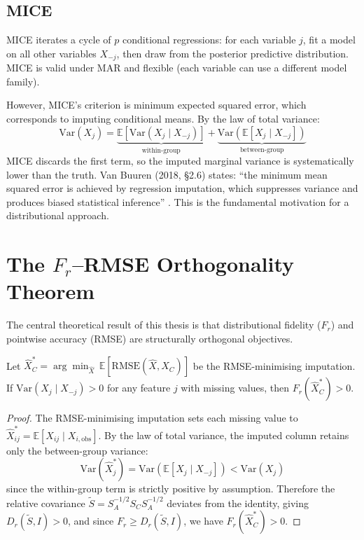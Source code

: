 \subsection{MICE}

MICE \cite{vanBuuren2011} iterates a cycle of $p$ conditional regressions: for each variable $j$, fit a model on all other variables $X_{-j}$, then draw from the posterior predictive distribution. MICE is valid under MAR and flexible (each variable can use a different model family).

However, MICE's criterion is minimum expected squared error, which corresponds to imputing conditional means. By the law of total variance:
\begin{equation}
    \text{Var}(X_j) = \underbrace{\mathbb{E}[\text{Var}(X_j \mid X_{-j})]}_{\text{within-group}} + \underbrace{\text{Var}(\mathbb{E}[X_j \mid X_{-j}])}_{\text{between-group}}
\end{equation}
MICE discards the first term, so the imputed marginal variance is systematically lower than the truth. Van Buuren (2018, \S2.6) states: ``the minimum mean squared error is achieved by regression imputation, which suppresses variance and produces biased statistical inference'' \cite{vanBuuren2018}. This is the fundamental motivation for a distributional approach.

\section{The \texorpdfstring{$F_r$}{Fr}--RMSE Orthogonality Theorem}
\label{sec:orthogonality}

The central theoretical result of this thesis is that distributional fidelity ($F_r$) and pointwise accuracy (RMSE) are structurally orthogonal objectives.

\begin{proposition}
\label{prop:rmse_implies_fr}
Let $\hat{X}_C^{*} = \arg\min_{\hat{X}}\,\mathbb{E}[\mathrm{RMSE}(\hat{X}, X_C)]$ be the RMSE-minimising imputation. If $\mathrm{Var}(X_j \mid X_{-j}) > 0$ for any feature $j$ with missing values, then $F_r(\hat{X}_C^{*}) > 0$.
\end{proposition}

\begin{proof}
The RMSE-minimising imputation sets each missing value to $\hat{X}_{ij}^{*} = \mathbb{E}[X_{ij} \mid X_{i,\text{obs}}]$. By the law of total variance, the imputed column retains only the between-group variance:
\[
  \mathrm{Var}(\hat{X}_j^{*}) = \mathrm{Var}(\mathbb{E}[X_j \mid X_{-j}]) < \mathrm{Var}(X_j)
\]
since the within-group term is strictly positive by assumption. Therefore the relative covariance $\tilde{S} = S_A^{-1/2} S_C S_A^{-1/2}$ deviates from the identity, giving $D_r(\tilde{S}, I) > 0$, and since $F_r \geq D_r(\tilde{S}, I)$, we have $F_r(\hat{X}_C^{*}) > 0$.
\end{proof}

